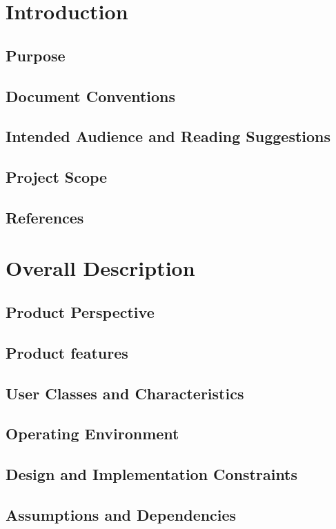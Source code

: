 \documentclass{article}
\title{}
\author{}
\date{}
\begin{document}
\section{Introduction}
	\subsection{Purpose}
	\subsection{Document Conventions}
	\subsection{Intended Audience and Reading Suggestions}
	\subsection{Project Scope}
	\subsection{References}

\section{Overall Description}
	\subsection{Product Perspective}
	\subsection{Product features}
	\subsection{User Classes and Characteristics}
	\subsection{Operating Environment}
	\subsection{Design and Implementation Constraints}
	\subsection{Assumptions and Dependencies}
\end{document}
